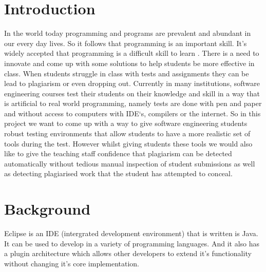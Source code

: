 \documentclass[twocolumn]{article}
\begin{document}


\begin{abstract}

\end{abstract}

\section{Introduction}
In the world today programming and programs are prevalent and abundant in our
every day lives. So it follows that programming is an important skill. It's
widely accepted that programming is a difficult skill to learn
\cite{jenkins2002difficulty, robins2003learning}. There is a need to innovate
and come up with some solutions to help students be more effective in class.
When students struggle in class with tests and assignments they can be lead to
plagiarism or even dropping out\cite{bennedsen2007failure}. Currently in many
institutions, software engineering courses test their students on their
knowledge and skill in a way that is artificial to real world programming,
namely tests are done with pen and paper and without access to computers with
IDE`s, compilers or the internet. So in this project we want to come up with a
way to give software engineering students robust testing environments that allow
students to have a more realistic set of tools during the test. However whilst
giving students these tools we would also like to give the teaching staff
confidence that plagiarism can be detected automatically without tedious manual
inspection of student submissions as well as detecting plagiarised work that the
student has attempted to conceal.

\section{Background}
Eclipse is an IDE (intergrated development environment) that is written is Java.
It can be used to develop in a variety of programming languages. And it also has
a plugin architecture which allows other developers to extend it's functionality
without changing it's core implementation.
\end{document}
